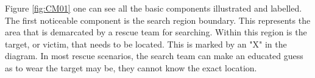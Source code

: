 Figure \ref{fig:CM01} one can see all the basic components illustrated and labelled. The first noticeable component is the search region boundary. This represents the area that is demarcated by a rescue team for searching. Within this region is the target, or victim, that needs to be located. This is marked by an "X" in the diagram. 
In most rescue scenarios, the search team can make an educated guess as to wear the target may be, they cannot know the exact location.
\begin{figure}[h!]
	\centering
	\begin{tikzpicture}[x=0.75pt,y=0.75pt,yscale=-0.83,xscale=0.83]
		

\end{tikzpicture}
\end{figure}
